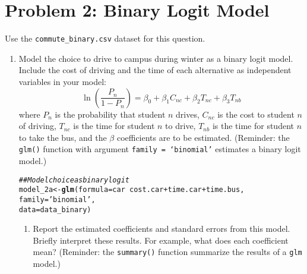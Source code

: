 \documentclass[11pt,letterpaper]{article}\usepackage[]{graphicx}\usepackage[]{color}
\makeatletter
\newcommand{\hlstr}[1]{\textcolor[rgb]{0.192,0.494,0.8}{#1}}%
\newcommand{\hlcom}[1]{\textcolor[rgb]{0.678,0.584,0.686}{\textit{#1}}}%
\newcommand{\hlopt}[1]{\textcolor[rgb]{0,0,0}{#1}}%
\newcommand{\hlstd}[1]{\textcolor[rgb]{0.345,0.345,0.345}{#1}}%
\newcommand{\hlkwb}[1]{\textcolor[rgb]{0.69,0.353,0.396}{#1}}%
\newcommand{\hlkwc}[1]{\textcolor[rgb]{0.333,0.667,0.333}{#1}}%
\newcommand{\hlkwd}[1]{\textcolor[rgb]{0.737,0.353,0.396}{\textbf{#1}}}%
\newenvironment{kframe}{%
 \def\at@end@of@kframe{}%
 \ifinner\ifhmode%
  \def\at@end@of@kframe{\end{minipage}}%
  \begin{minipage}{\columnwidth}%
 \fi\fi%
 \def\FrameCommand##1{\hskip\@totalleftmargin \hskip-\fboxsep
 \colorbox{shadecolor}{##1}\hskip-\fboxsep
     \hskip-\linewidth \hskip-\@totalleftmargin \hskip\columnwidth}%
 \MakeFramed {\advance\hsize-\width
   \@totalleftmargin\z@ \linewidth\hsize
   \@setminipage}}%
 {\par\unskip\endMakeFramed%
 \at@end@of@kframe}
\newenvironment{knitrout}{}{} %
\makeatother
\begin{document}
\section*{Problem 2: Binary Logit Model}

Use the \texttt{commute\_binary.csv} dataset for this question.

\begin{enumerate}[label=\alph*., leftmargin=*]
	\item Model the choice to drive to campus during winter as a binary logit model. Include the cost of driving and the time of each alternative as independent variables in your model:
	$$\ln \left( \frac{P_n}{1 - P_n} \right) = \beta_0 + \beta_1 C_{nc} + \beta_2 T_{nc} + \beta_3 T_{nb}$$
	where $P_n$ is the probability that student $n$ drives, $C_{nc}$ is the cost to student $n$ of driving, $T_{nc}$ is the time for student $n$ to drive, $T_{nb}$ is the time for student $n$ to take the bus, and the $\beta$ coefficients are to be estimated. (Reminder: the \texttt{glm()} function with argument \texttt{family = `binomial'} estimates a binary logit model.)

\begin{knitrout}
\color{fgcolor}\begin{kframe}
\begin{alltt}
\hlcom{## Model choice as binary logit}
\hlstd{model_2a} \hlkwb{<-} \hlkwd{glm}\hlstd{(}\hlkwc{formula} \hlstd{= car} \hlopt{~} \hlstd{cost.car} \hlopt{+} \hlstd{time.car} \hlopt{+} \hlstd{time.bus,}
                \hlkwc{family} \hlstd{=} \hlstr{'binomial'}\hlstd{,}
                \hlkwc{data} \hlstd{= data_binary)}
\end{alltt}
\end{kframe}
\end{knitrout}

	\begin{enumerate}[label=\roman*.]
		\item Report the estimated coefficients and standard errors from this model. Briefly interpret these results. For example, what does each coefficient mean? (Reminder: the \texttt{summary()} function summarize the results of a \texttt{glm} model.)


\end{enumerate}
\end{enumerate}
\end{document}
